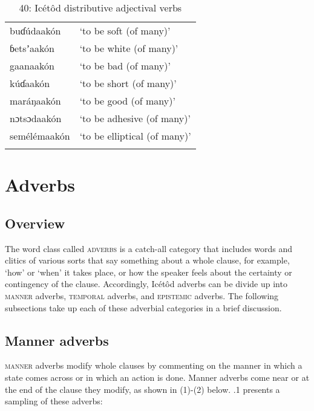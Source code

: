 \begin{table}
\caption{40: Icétôd distributive adjectival verbs}
\label{tab:8}


\begin{tabularx}{\textwidth}{XX}
\lsptoprule

buɗúdaakón & ‘to be soft (of many)’\\
ɓetsʼaakón & ‘to be white (of many)’\\
gaanaakón & ‘to be bad (of many)’\\
kúɗaakón & ‘to be short (of many)’\\
maráŋaakón & ‘to be good (of many)’\\
nɔtsɔdaakón & ‘to be adhesive (of many)’\\
semélémaakón & ‘to be elliptical (of many)’\\
\lspbottomrule
\end{tabularx}
\end{table}

\section{Adverbs}



\subsection{Overview}


The word class called \textsc{adverbs} is a catch-all category that includes words and clitics of various sorts that say something about a whole clause, for example, ‘how’ or ‘when’ it takes place, or how the speaker feels about the certainty or contingency of the clause. Accordingly, Icétôd adverbs can be divide up into \textsc{manner} adverbs, \textsc{temporal} adverbs, and \textsc{epistemic} adverbs. The following subsections take up each of these adverbial categories in a brief discussion.




\subsection{Manner adverbs}


\textsc{manner} adverbs modify whole clauses by commenting on the manner in which a state comes across or in which an action is done. Manner adverbs come near or at the end of the clause they modify, as shown in (1)-(2) below. .1 presents a sampling of these adverbs:



